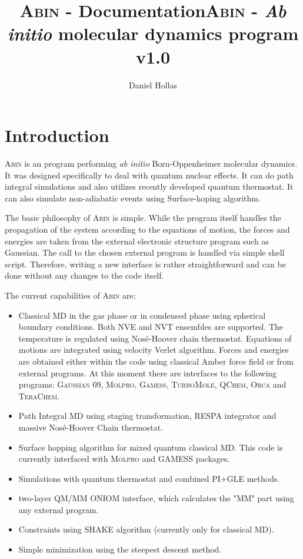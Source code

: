 \documentclass[12pt,a4paper]{article}
\author{Daniel Hollas}
\title{\textsc{Abin} - Documentation}
\title{\textsc{Abin} -  \textit{Ab initio} molecular dynamics program \\ v1.0}
\begin{document}
\maketitle

\newcommand{\abin}{\textsc{Abin} }

\tableofcontents
\newpage

\section{Introduction}
\abin is an program performing \textit{ab initio} Born-Oppenheimer molecular dynamics. It was designed specifically to deal with quantum nuclear effects. It can do path integral simulations and also utilizes recently developed quantum thermostat\cite{Ceriotti2011}.
It can also simulate non-adiabatic events using Surface-hoping algorithm.   

The basic philosophy of \abin is simple. While the program itself handles the propagation of the system according to the equations of motion, the forces and energies are taken from the external electronic structure program such as Gaussian. The call to the chosen external program is handled via simple shell script. Therefore, writing a new interface is rather straightforward and can be done without any changes to the code itself.

The current capabilities of \abin are:
\begin{itemize}
\item Classical MD in the gas phase or in condensed phase using spherical boundary conditions. Both NVE and NVT ensembles are supported. The temperature is regulated using Nosé-Hoover chain thermostat\cite{Martyna1992a}. Equations of motions are integrated using velocity Verlet algorithm. Forces and energies are obtained either within the code using classical Amber force field or from external programs. 
At this moment there are interfaces to the following programs: \textsc{Gaussian 09\cite{G09}}, \textsc{Molpro}\cite{MOLPRO06}, \textsc{Gamess}\cite{Schmidt1993}, \textsc{TurboMole}\cite{turbomole}, \textsc{QChem}\cite{Shao2006}, \textsc{Orca}\cite{orca} and \textsc{TeraChem}\cite{Ufimtsev2009}. 

\item Path Integral MD using staging transformation, RESPA integrator and massive Nosé-Hoover Chain thermostat.
\item Surface hopping algorithm\cite{Barbatti2011} for mixed quantum classical MD. This code is currently interfaced with \textsc{Molpro} and \textsc{GAMESS} packages. 
\item Simulations with quantum thermostat\cite{Ceriotti2010d} and combined PI+GLE\cite{Ceriotti2011} methods.
\item two-layer QM/MM ONIOM interface, which calculates the "MM" part using any external program.
\item Constraints using SHAKE algorithm (currently only for classical MD).
\item Simple minimization using the steepest descent method. 
\end{itemize} 
\end{document}

